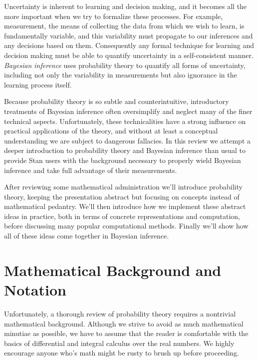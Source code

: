 \documentclass[11pt, oneside]{article}
\begin{document}
Uncertainty is inherent to learning and decision making, and it becomes all 
the more important when we try to formalize these processes.  For example,
measurement, the means of collecting the data from which we wish to learn, 
is fundamentally variable, and this variability must propagate to our inferences 
and any decisions based on them.  Consequently any formal technique for 
learning and decision making must be able to quantify uncertainty in a
self-consistent manner.  \emph{Bayesian inference} uses probability theory 
to quantify all forms of uncertainty, including not only the variability in 
measurements but also ignorance in the learning process itself.  

Because probability theory is so subtle and counterintuitive, introductory 
treatments of Bayesian inference often oversimplify and neglect many 
of the finer technical aspects.  Unfortunately, these technicalities have
a strong influence on practical applications of the theory, and without at 
least a conceptual understanding we are subject to dangerous fallacies.
In this review we attempt a deeper introduction to probability theory and 
Bayesian inference than usual to provide Stan users with the background 
necessary to properly wield Bayesian inference and take full advantage
of their measurements.

After reviewing some mathematical administration we'll introduce 
probability theory, keeping the presentation abstract but focusing on 
concepts instead of mathematical pedantry.  We'll then introduce how
we implement these abstract ideas in practice, both in terms of
concrete representations and computation, before discussing many
popular computational methods.  Finally we'll show how all of these
ideas come together in Bayesian inference.

\section{Mathematical Background and Notation}

Unfortunately, a thorough review of probability theory requires a nontrivial
mathematical background.  Although we strive to avoid as much mathematical
minutiae as possible, we have to assume that the reader is comfortable 
with the basics of differential and integral calculus over the real numbers.  
We highly encourage anyone who's math might be rusty to brush up before
proceeding.
\end{document}
